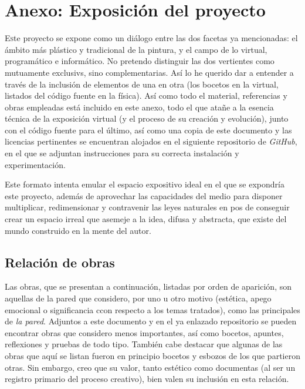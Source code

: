 \documentclass[twoside]{article}
\begin{document}
\hypertarget{anexo-exposiciuxf3n-del-proyecto}{%
  \section{Anexo: Exposición del
    proyecto}\label{anexo-exposiciuxf3n-del-proyecto}}
\begin{multicols}{2}

  \lettrine[nindent=0em,lines=3]{E}ste proyecto se expone como un diálogo entre las dos facetas ya mencionadas:
  el ámbito más plástico y tradicional de la pintura, y el campo de lo virtual,
  programático e informático. No pretendo distinguir las dos vertientes como
  mutuamente exclusivs, sino complementarias. Así lo he querido dar a entender
  a través de la inclusión de elementos de una en otra (los bocetos en la virtual,
  listados del código fuente en la física). Así como todo el material, referencias y
  obras empleadas está incluido en este anexo, todo el que atañe a la esencia técnica
  de la exposición virtual (y el proceso de su creación y evolución), junto con el código
  fuente para el último, así como una copia de este documento y las licencias pertinentes
  se encuentran alojados en el siguiente repositorio de \emph{GitHub}, en el que se adjuntan
  instrucciones para su correcta instalación y experimentación.

  Este formato intenta emular el espacio expositivo ideal en el que se
  expondría este proyecto, además de aprovechar las capacidades del medio
  para disponer multiplicar, redimensionar y contravenir las leyes
  naturales en pos de conseguir crear un espacio irreal que asemeje a la
  idea, difusa y abstracta, que existe del mundo construido en la mente
  del autor.
\end{multicols}
\hypertarget{relaciuxf3n-de-obras}{%
  \subsection{Relación de obras}\label{relaciuxf3n-de-obras}}
  Las obras, que se presentan a continuación, listadas por orden de aparición, son aquellas de la
  pared que considero, por uno u otro motivo (estética, apego emocional o significancia ccon respecto
  a los temas tratados), como las principales de \emph{la pared}. Adjuntos a este documento y en el
  ya enlazado repositorio se pueden encontrar obras que considero menos importantes, así como bocetos,
  apuntes, reflexiones y pruebas de todo tipo. También cabe destacar que algunas de las obras que aquí
  se listan fueron en principio bocetos y esbozos de los que partieron otras. Sin embargo, creo que su
  valor, tanto estético como documentas (al ser un registro primario del proceso creativo), bien valen 
  su inclusión en esta relación.
\end{document}
